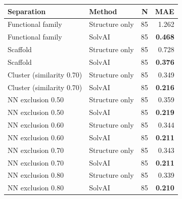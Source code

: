 \begin{tabular}{llrr}
\toprule
Separation & Method & N & MAE \\
\midrule
Functional family & Structure only & 85 & 1.262 \\
Functional family & SolvAI & 85 & \textbf{0.468} \\
Scaffold & Structure only & 85 & 0.728 \\
Scaffold & SolvAI & 85 & \textbf{0.376} \\
Cluster (similarity 0.70) & Structure only & 85 & 0.349 \\
Cluster (similarity 0.70) & SolvAI & 85 & \textbf{0.216} \\
NN exclusion 0.50 & Structure only & 85 & 0.359 \\
NN exclusion 0.50 & SolvAI & 85 & \textbf{0.219} \\
NN exclusion 0.60 & Structure only & 85 & 0.344 \\
NN exclusion 0.60 & SolvAI & 85 & \textbf{0.211} \\
NN exclusion 0.70 & Structure only & 85 & 0.343 \\
NN exclusion 0.70 & SolvAI & 85 & \textbf{0.211} \\
NN exclusion 0.80 & Structure only & 85 & 0.339 \\
NN exclusion 0.80 & SolvAI & 85 & \textbf{0.210} \\
\bottomrule
\end{tabular}
